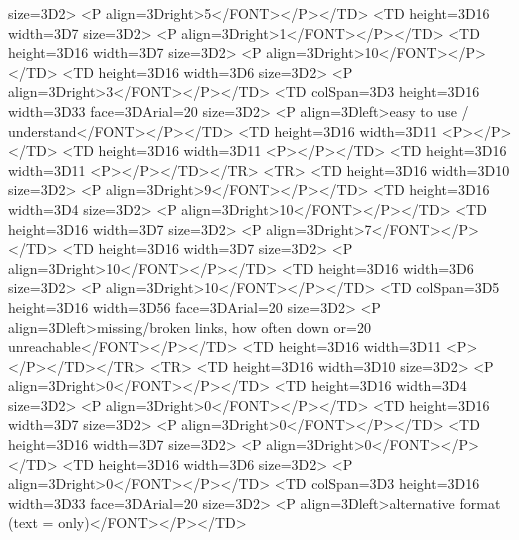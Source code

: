 size=3D2>
            <P align=3Dright>5</FONT></P></TD>
        <TD height=3D16 width=3D7%
size=3D2>
            <P align=3Dright>1</FONT></P></TD>
        <TD height=3D16 width=3D7%
size=3D2>
            <P align=3Dright>10</FONT></P></TD>
        <TD height=3D16 width=3D6%
size=3D2>
            <P align=3Dright>3</FONT></P></TD>
        <TD colSpan=3D3 height=3D16 width=3D33%
face=3DArial=20
            size=3D2>
            <P align=3Dleft>easy to use / understand</FONT></P></TD>
        <TD height=3D16 width=3D11%
            <P></P></TD>
        <TD height=3D16 width=3D11%
            <P></P></TD>
        <TD height=3D16 width=3D11%
            <P></P></TD></TR>
    <TR>
        <TD height=3D16 width=3D10%
size=3D2>
            <P align=3Dright>9</FONT></P></TD>
        <TD height=3D16 width=3D4%
size=3D2>
            <P align=3Dright>10</FONT></P></TD>
        <TD height=3D16 width=3D7%
size=3D2>
            <P align=3Dright>7</FONT></P></TD>
        <TD height=3D16 width=3D7%
size=3D2>
            <P align=3Dright>10</FONT></P></TD>
        <TD height=3D16 width=3D6%
size=3D2>
            <P align=3Dright>10</FONT></P></TD>
        <TD colSpan=3D5 height=3D16 width=3D56%
face=3DArial=20
            size=3D2>
            <P align=3Dleft>missing/broken links, how often down or=20
            unreachable</FONT></P></TD>
        <TD height=3D16 width=3D11%
            <P></P></TD></TR>
    <TR>
        <TD height=3D16 width=3D10%
size=3D2>
            <P align=3Dright>0</FONT></P></TD>
        <TD height=3D16 width=3D4%
size=3D2>
            <P align=3Dright>0</FONT></P></TD>
        <TD height=3D16 width=3D7%
size=3D2>
            <P align=3Dright>0</FONT></P></TD>
        <TD height=3D16 width=3D7%
size=3D2>
            <P align=3Dright>0</FONT></P></TD>
        <TD height=3D16 width=3D6%
size=3D2>
            <P align=3Dright>0</FONT></P></TD>
        <TD colSpan=3D3 height=3D16 width=3D33%
face=3DArial=20
            size=3D2>
            <P align=3Dleft>alternative format (text =
only)</FONT></P></TD>
